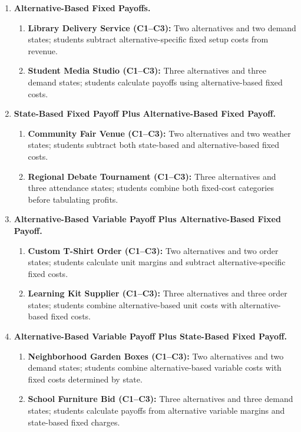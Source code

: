 \begin{enumerate}
		\item \textbf{Alternative-Based Fixed Payoffs.}
		\begin{enumerate}
			\item \textbf{Library Delivery Service (C1--C3):} Two alternatives and two demand states; students subtract alternative-specific fixed setup costs from revenue.
			\item \textbf{Student Media Studio (C1--C3):} Three alternatives and three demand states; students calculate payoffs using alternative-based fixed costs.
		\end{enumerate}
		\item \textbf{State-Based Fixed Payoff Plus Alternative-Based Fixed Payoff.}
		\begin{enumerate}
			\item \textbf{Community Fair Venue (C1--C3):} Two alternatives and two weather states; students subtract both state-based and alternative-based fixed costs.
			\item \textbf{Regional Debate Tournament (C1--C3):} Three alternatives and three attendance states; students combine both fixed-cost categories before tabulating profits.
		\end{enumerate}
		\item \textbf{Alternative-Based Variable Payoff Plus Alternative-Based Fixed Payoff.}
		\begin{enumerate}
			\item \textbf{Custom T-Shirt Order (C1--C3):} Two alternatives and two order states; students calculate unit margins and subtract alternative-specific fixed costs.
			\item \textbf{Learning Kit Supplier (C1--C3):} Three alternatives and three order states; students combine alternative-based unit costs with alternative-based fixed costs.
		\end{enumerate}
		\item \textbf{Alternative-Based Variable Payoff Plus State-Based Fixed Payoff.}
		\begin{enumerate}
			\item \textbf{Neighborhood Garden Boxes (C1--C3):} Two alternatives and two demand states; students combine alternative-based variable costs with fixed costs determined by state.
			\item \textbf{School Furniture Bid (C1--C3):} Three alternatives and three demand states; students calculate payoffs from alternative variable margins and state-based fixed charges.
		\end{enumerate}

\end{enumerate}
